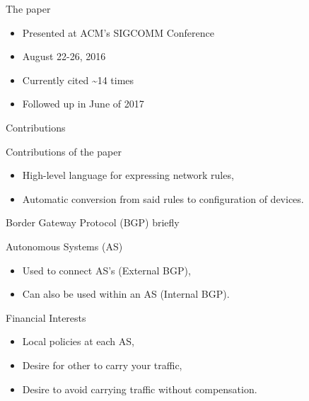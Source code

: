 \begin{frame}{The paper}
    \begin{block}{}
        \begin{itemize}
            \item Presented at ACM's SIGCOMM Conference
            \item August 22-26, 2016
            \item Currently cited \~{}14 times
            \item Followed up in June of 2017
        \end{itemize}
    \end{block}
\end{frame}

\begin{frame}{Contributions}
    \begin{block}{Contributions of the paper}
        \begin{itemize}
            \item High-level language for expressing \textcolor{ReneOrange}{network rules},
            \item \textcolor{ReneOrange}{Automatic conversion} from said rules to configuration of devices.
        \end{itemize}
    \end{block}
\end{frame}

\begin{frame}{Border Gateway Protocol (BGP) briefly}
    \begin{block}{Autonomous Systems (AS)}
        \begin{itemize}
            \item Used to connect AS's (External BGP),
            \item Can also be used within an AS (Internal BGP).
        \end{itemize}
    \end{block}
    \begin{block}{Financial Interests}
        \begin{itemize}
            \item Local policies at each AS,
            \item Desire for other to carry your traffic,
            \item Desire to avoid carrying traffic without compensation.
        \end{itemize}
    \end{block}
\end{frame}

